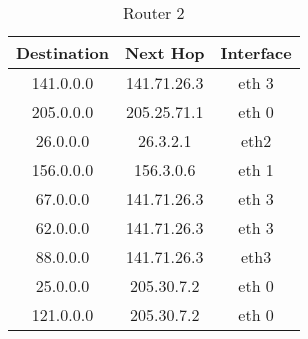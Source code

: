 \documentclass{WeSTassignment}
\begin{document}
\begin{table}[h]
\centering
\caption{Router 2}
\label{Router 2}
\begin{tabular}{ccc}
\hline
\multicolumn{1}{|c|}{\textbf{Destination}} & \multicolumn{1}{c|}{\textbf{Next Hop}} & \multicolumn{1}{c|}{\textbf{Interface}} \\ \hline
141.0.0.0                                  & 141.71.26.3                            & eth 3                                   \\
205.0.0.0                                  & 205.25.71.1                            & eth 0                                   \\
26.0.0.0                                   & 26.3.2.1                               & eth2                                    \\
156.0.0.0                                  & 156.3.0.6                              & eth 1                                   \\
67.0.0.0                                   & 141.71.26.3                            & eth 3                                   \\
62.0.0.0                                   & 141.71.26.3                            & eth 3                                   \\
88.0.0.0                                   & 141.71.26.3                            & eth3                                    \\
25.0.0.0                                   & 205.30.7.2                             & eth 0                                   \\
121.0.0.0                                  & 205.30.7.2                             & eth 0                                  
\end{tabular}
\end{table}
\end{document}
